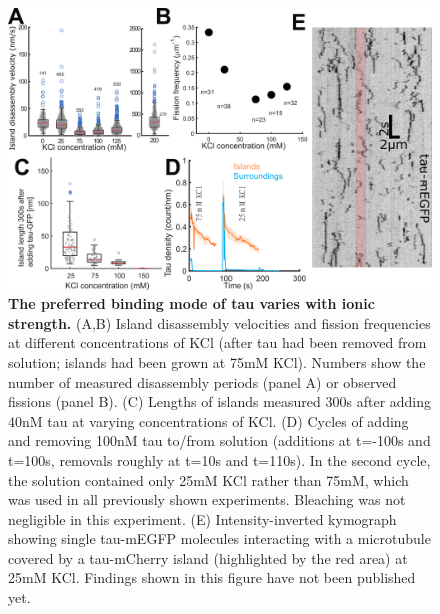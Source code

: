 \begin{figure}[h!]
	\centering
	\includegraphics[width=1\linewidth]{Figures/tausalt.png}
	\caption[The preferred binding mode of tau varies with ionic strength.]{
	\textbf{The preferred binding mode of tau varies with ionic strength.} (A,B) Island disassembly velocities and fission frequencies at different concentrations of KCl (after tau had been removed from solution; islands had been grown at 75mM KCl). Numbers show the number of measured disassembly periods (panel A) or observed fissions (panel B). (C) Lengths of islands measured 300s after adding 40nM tau at varying concentrations of KCl. (D) Cycles of adding and removing 100nM tau to/from solution (additions at t=-100s and t=100s, removals roughly at t=10s and t=110s). In the second cycle, the solution contained only 25mM KCl rather than 75mM, which was used in all previously shown experiments. Bleaching was not negligible in this experiment. (E) Intensity-inverted kymograph showing single tau-mEGFP molecules interacting with a microtubule covered by a tau-mCherry island (highlighted by the red area) at 25mM KCl. Findings shown in this figure have not been published yet.
		}\label{tausalt}
\end{figure}

